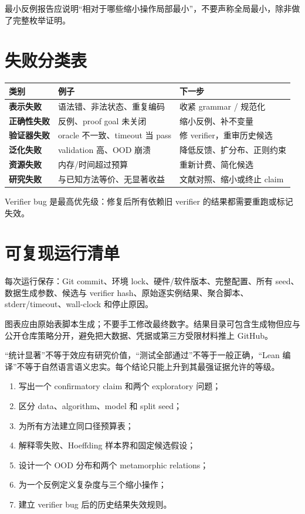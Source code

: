 最小反例报告应说明“相对于哪些缩小操作局部最小”，不要声称全局最小，除非做了完整枚举证明。

\section{失败分类表}

\begin{center}
\begin{tabularx}{0.96\textwidth}{>{\bfseries}lX X}
\toprule
类别 & 例子 & 下一步 \\
\midrule
表示失败 & 语法错、非法状态、重复编码 & 收紧 grammar / 规范化 \\
正确性失败 & 反例、proof goal 未关闭 & 缩小反例、补不变量 \\
验证器失败 & oracle 不一致、timeout 当 pass & 修 verifier，重审历史候选 \\
泛化失败 & validation 高、OOD 崩溃 & 降低反馈、扩分布、正则约束 \\
资源失败 & 内存/时间超过预算 & 重新计费、简化候选 \\
研究失败 & 与已知方法等价、无显著收益 & 文献对照、缩小或终止 claim \\
\bottomrule
\end{tabularx}
\end{center}
Verifier bug 是最高优先级：修复后所有依赖旧 verifier 的结果都需要重跑或标记失效。

\section{可复现运行清单}

每次运行保存：Git commit、环境 lock、硬件/软件版本、完整配置、所有 seed、数据生成参数、候选与 verifier hash、原始逐实例结果、聚合脚本、stderr/timeout、wall-clock 和停止原因。

图表应由原始表脚本生成；不要手工修改最终数字。结果目录可包含生成物但应与公开仓库策略分开，避免把大数据、凭据或第三方受限材料推上 GitHub。

\begin{warningbox}
“统计显著”不等于效应有研究价值，“测试全部通过”不等于一般正确，“Lean 编译”不等于自然语言语义忠实。每个结论只能上升到其最强证据允许的等级。
\end{warningbox}

\begin{checkpointbox}
\begin{enumerate}
  \item 写出一个 confirmatory claim 和两个 exploratory 问题；
  \item 区分 data、algorithm、model 和 split seed；
  \item 为所有方法建立同口径预算表；
  \item 解释零失败、Hoeffding 样本界和固定候选假设；
  \item 设计一个 OOD 分布和两个 metamorphic relations；
  \item 为一个反例定义复杂度与三个缩小操作；
  \item 建立 verifier bug 后的历史结果失效规则。
\end{enumerate}
\end{checkpointbox}
